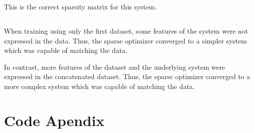 \documentclass[11pt]{article}
\begin{document}
This is the correct sparsity matrix for this system.


\subsection{} %
When training using only the first dataset, some features of the system were not expressed in the data. Thus, the sparse optimizer converged to a simpler system which was capable of matching the data.

In contrast, more features of the dataset and the underlying system were expressed in the concatenated dataset. Thus, the sparse optimizer converged to a more complex system which was capable of matching the data.


\section*{Code Apendix}






\end{document}
